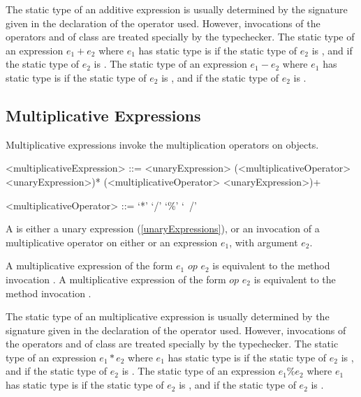\documentclass[makeidx]{article}
\begin{document}
{\LMHash{}%
The static type of an additive expression is usually determined by the signature given in the declaration of the operator used.
However, invocations of the operators \code{+} and \code{-} of class  are treated specially by the typechecker.
The static type of an expression $e_1 + e_2$ where $e_1$ has static type  is  if the static type of $e_2$ is , and  if the static type of $e_2$ is .
The static type of an expression $e_1 - e_2$ where $e_1$ has static type  is  if the static type of $e_2$ is , and  if the static type of $e_2$ is .


\subsection{Multiplicative Expressions}

\LMHash{}%
Multiplicative expressions invoke the multiplication operators on objects.

\begin{grammar}
<multiplicativeExpression> ::= \gnewline{}
  <unaryExpression> (<multiplicativeOperator> <unaryExpression>)*
  \alt \SUPER{} (<multiplicativeOperator> <unaryExpression>)+

<multiplicativeOperator> ::= `*'
  \alt `/'
  \alt `\%'
  \alt `~/'
\end{grammar}

\LMHash{}%
 A  is either a unary expression (\ref{unaryExpressions}), or an invocation of a multiplicative operator on either \SUPER{} or an expression $e_1$, with argument $e_2$.

\LMHash{}%
A multiplicative expression of the form $e_1$ $op$ $e_2$ is equivalent to the method invocation .
A multiplicative expression of the form \SUPER{} $op$ $e_2$ is equivalent to the method invocation .

\LMHash{}%
The static type of an multiplicative expression is usually determined by the signature given in the declaration of the operator used.
However, invocations of the operators \code{*} and \code{\%} of class  are treated specially by the typechecker.
The static type of an expression $e_1 * e_2$ where $e_1$ has static type  is  if the static type of $e_2$ is , and  if the static type of $e_2$ is .
The static type of an expression $e_1 \% e_2$ where $e_1$ has static type  is  if the static type of $e_2$ is , and  if the static type of $e_2$ is .


}
\end{document}
